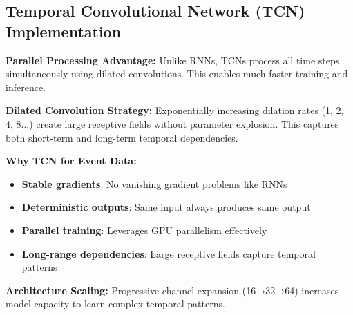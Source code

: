 \documentclass[12pt,a4paper]{article}
\begin{document}
\subsection{Temporal Convolutional Network (TCN) Implementation}

\textbf{Parallel Processing Advantage:} Unlike RNNs, TCNs process all time steps simultaneously using dilated convolutions. This enables much faster training and inference.

\textbf{Dilated Convolution Strategy:} Exponentially increasing dilation rates (1, 2, 4, 8...) create large receptive fields without parameter explosion. This captures both short-term and long-term temporal dependencies.

\textbf{Why TCN for Event Data:}
\begin{itemize}
    \item \textbf{Stable gradients}: No vanishing gradient problems like RNNs
    \item \textbf{Deterministic outputs}: Same input always produces same output
    \item \textbf{Parallel training}: Leverages GPU parallelism effectively
    \item \textbf{Long-range dependencies}: Large receptive fields capture temporal patterns
\end{itemize}

\textbf{Architecture Scaling:} Progressive channel expansion (16→32→64) increases model capacity to learn complex temporal patterns.
\end{document}
